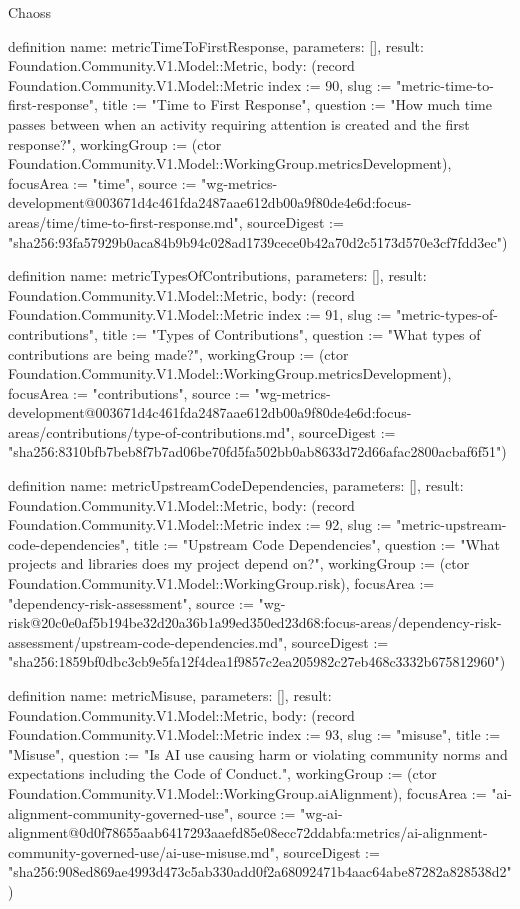 \begin{lexlean}{Chaoss}
\begin{semanticmodule}
definition{
  name: metricTimeToFirstResponse,
  parameters: [],
  result: Foundation.Community.V1.Model::Metric,
  body: (record Foundation.Community.V1.Model::Metric {index := 90, slug := "metric-time-to-first-response", title := "Time to First Response", question := "How much time passes between when an activity requiring attention is created and the first response?", workingGroup := (ctor Foundation.Community.V1.Model::WorkingGroup.metricsDevelopment), focusArea := "time", source := "wg-metrics-development@003671d4c461fda2487aae612db00a9f80de4e6d:focus-areas/time/time-to-first-response.md", sourceDigest := "sha256:93fa57929b0aca84b9b94c028ad1739cece0b42a70d2c5173d570e3cf7fdd3ec"})
}

definition{
  name: metricTypesOfContributions,
  parameters: [],
  result: Foundation.Community.V1.Model::Metric,
  body: (record Foundation.Community.V1.Model::Metric {index := 91, slug := "metric-types-of-contributions", title := "Types of Contributions", question := "What types of contributions are being made?", workingGroup := (ctor Foundation.Community.V1.Model::WorkingGroup.metricsDevelopment), focusArea := "contributions", source := "wg-metrics-development@003671d4c461fda2487aae612db00a9f80de4e6d:focus-areas/contributions/type-of-contributions.md", sourceDigest := "sha256:8310bfb7beb8f7b7ad06be70fd5fa502bb0ab8633d72d66afac2800acbaf6f51"})
}

definition{
  name: metricUpstreamCodeDependencies,
  parameters: [],
  result: Foundation.Community.V1.Model::Metric,
  body: (record Foundation.Community.V1.Model::Metric {index := 92, slug := "metric-upstream-code-dependencies", title := "Upstream Code Dependencies", question := "What projects and libraries does my project depend on?", workingGroup := (ctor Foundation.Community.V1.Model::WorkingGroup.risk), focusArea := "dependency-risk-assessment", source := "wg-risk@20c0e0af5b194be32d20a36b1a99ed350ed23d68:focus-areas/dependency-risk-assessment/upstream-code-dependencies.md", sourceDigest := "sha256:1859bf0dbc3cb9e5fa12f4dea1f9857c2ea205982c27eb468c3332b675812960"})
}

definition{
  name: metricMisuse,
  parameters: [],
  result: Foundation.Community.V1.Model::Metric,
  body: (record Foundation.Community.V1.Model::Metric {index := 93, slug := "misuse", title := "Misuse", question := "Is AI use causing harm or violating community norms and expectations including the Code of Conduct.", workingGroup := (ctor Foundation.Community.V1.Model::WorkingGroup.aiAlignment), focusArea := "ai-alignment-community-governed-use", source := "wg-ai-alignment@0d0f78655aab6417293aaefd85e08ecc72ddabfa:metrics/ai-alignment-community-governed-use/ai-use-misuse.md", sourceDigest := "sha256:908ed869ae4993d473c5ab330add0f2a68092471b4aac64abe87282a828538d2"})
}


\end{semanticmodule}
\end{lexlean}
